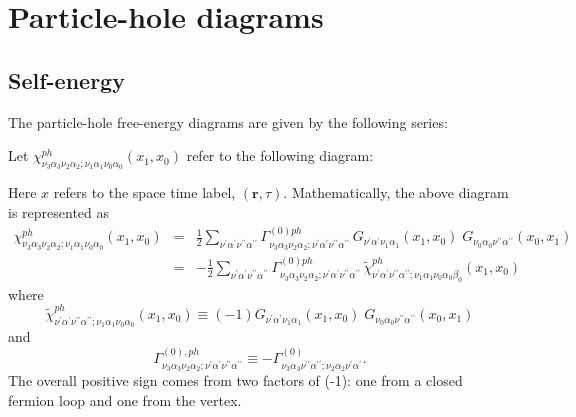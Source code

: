 \chapter{Particle-hole diagrams}
\label{chapter:particle-hole}

\section{Self-energy}
The particle-hole free-energy diagrams are given by
the following series:

\begin{center}
\end{center}

Let $\chi^{ph}_{\nu_3\alpha_3 \nu_2 \alpha_2; 
\nu_1\alpha_1 \nu_0\alpha_0}(x_1,x_0)$ refer
to the following diagram:

\begin{center}
\end{center}

Here $x$ refers to the space time label, $(\mathbf{r},\tau)$.
Mathematically, the above diagram is represented as
\begin{eqnarray}
\label{k_ph}
\chi^{ph}_{\nu_3\alpha_3 \nu_2 \alpha_2; \nu_1 \alpha_1 \nu_0\alpha_0}(x_1,x_0) 
& = & \frac{1}{2} \sum_{\nu^{\prime}\alpha^{\prime}\nu^{\prime\prime} \alpha^{\prime\prime}}
\Gamma^{(0)ph}_{\nu_3\alpha_3\nu_2\alpha_2; 
\nu^{\prime}\alpha^{\prime}\nu^{\prime\prime}\alpha^{\prime\prime}}\,
G_{\nu^{\prime}\alpha^{\prime}\nu_1 \alpha_1}(x_1,x_0) \; G_{\nu_0\alpha_0 
\nu^{\prime\prime}\alpha^{\prime\prime}}(x_0,x_1) \\
& = & -\frac{1}{2}\sum_{\nu^{\prime}\alpha^{\prime}\nu^{\prime\prime} \alpha^{\prime\prime}} 
\Gamma^{(0)ph}_{\nu_3\alpha_3 \nu_2 \alpha_2; \nu^{\prime}\alpha^{\prime}
\nu^{\prime\prime}\alpha^{\prime\prime}}\,
\tilde{\chi}^{ph}_{\nu^{\prime}\alpha^{\prime}\nu^{\prime\prime} \alpha^{\prime\prime}; 
\nu_1\alpha_1\nu_0\alpha_0 \beta_0}(x_1,x_0)
\end{eqnarray}
where
\begin{equation}
\label{chi_ph}
\tilde{\chi}^{ph}_{\nu^{\prime}\alpha^{\prime}\nu^{\prime\prime}\alpha^{\prime\prime}; 
\nu_1\alpha_1 \nu_0\alpha_0}(x_1,x_0) \equiv
(-1) G_{\nu^{\prime}\alpha^{\prime}\nu_1 \alpha_1}(x_1,x_0) \; 
G_{\nu_0\alpha_0 \nu^{\prime\prime}\alpha^{\prime\prime}}(x_0,x_1)
\end{equation}
and
\begin{equation}
\Gamma^{(0),ph}_{\nu_3\alpha_3 \nu_2 \alpha_2; \nu^{\prime}\alpha^{\prime}
\nu^{\prime\prime}\alpha^{\prime\prime}} \equiv
- \Gamma^{(0)}_{\nu_3\alpha_3 \nu^{\prime\prime}\alpha^{\prime\prime}; 
\nu_2\alpha_2 \nu^{\prime}\alpha^{\prime}}.
\end{equation}
The overall positive sign comes from two factors of (-1):
one from a closed fermion loop and one from the vertex.

